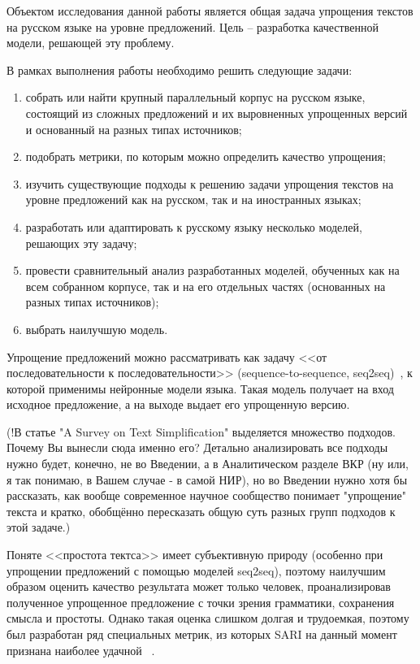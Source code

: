 Объектом исследования данной работы является общая задача упрощения текстов на русском языке на уровне предложений. Цель -- разработка качественной модели, решающей эту проблему.

В рамках выполнения работы необходимо решить следующие задачи: 
\begin{enumerate}[label={\arabic*)}]
	\item собрать или найти крупный параллельный корпус на русском языке, состоящий из сложных предложений и их выровненных упрощенных версий и основанный на разных типах источников;
	\item подобрать метрики, по которым можно определить качество упрощения;
	\item изучить существующие подходы к решению задачи упрощения текстов на уровне предложений как на русском, так и на иностранных языках;
	\item разработать или адаптировать к русскому языку несколько моделей, решающих эту задачу;
	\item провести сравнительный анализ разработанных моделей, обученных как на всем собранном корпусе, так и на его отдельных частях (основанных на разных типах источников);
	\item выбрать наилучшую модель.
\end{enumerate}




Упрощение предложений можно рассматривать как задачу <<от последовательности к последовательности>> (sequence-to-sequence, seq2seq)~\cite{kazan_federal_university}, к которой применимы нейронные модели языка. Такая модель получает на вход исходное предложение, а на выходе выдает его упрощенную версию.

(!В статье "A Survey on Text Simplification" выделяется множество подходов. Почему Вы вынесли сюда именно его? Детально анализировать все подходы нужно будет, конечно, не во Введении, а в Аналитическом разделе ВКР (ну или, я так понимаю, в Вашем случае - в самой НИР), но во Введении нужно хотя бы рассказать, как вообще современное научное сообщество понимает "упрощение" текста и кратко, обобщённо пересказать общую суть разных групп подходов к этой задаче.)

Поняте <<простота тектса>> имеет субъективную природу (особенно при упрощении предложений с помощью моделей seq2seq), поэтому наилучшим образом оценить качество результата может только человек, проанализировав полученное упрощенное предложение с точки зрения грамматики, сохранения смысла и простоты. Однако такая оценка слишком долгая и трудоемкая, поэтому был разработан ряд специальных метрик, из которых SARI на данный момент признана наиболее удачной ~\cite{xu_optimizing_2016}. 

